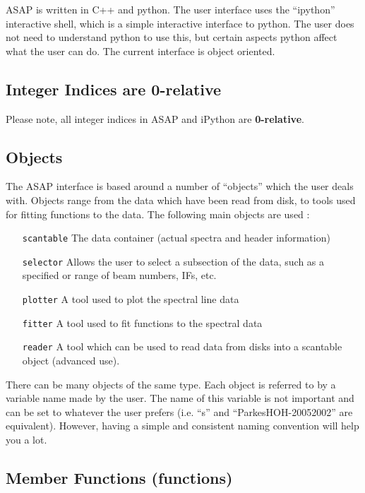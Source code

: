 \documentclass[11pt]{article}
\newcommand{\cmd}[1]{{\tt #1}}
\begin{document}
ASAP is written in C++ and python. The user interface
uses the ``ipython'' interactive shell, which is a simple interactive
interface to python. The user does not need to understand python to
use this, but certain aspects python affect what the user can do.  The
current interface is object oriented.

\subsection {Integer Indices are 0-relative}

Please note, all integer indices in ASAP and iPython are {\bf 0-relative}.

\subsection{Objects}
The ASAP interface is based around a number of ``objects'' which the
user deals with. Objects range from the data which have been read from
disk, to tools used for fitting functions to the data. The following
main objects are used :

\begin{itemize}
  \item[\cmd{scantable}] The data container (actual spectra and header
    information)
  \item[\cmd{selector}] Allows the user to select a subsection of the
    data, such as a specified or range of beam numbers, IFs, etc.
  \item[\cmd{plotter}] A tool used to plot the spectral line data
  \item[\cmd{fitter}] A tool used to fit functions to the spectral data
  \item[\cmd{reader}] A tool which can be used to read data from disks
    into a scantable object (advanced use).
\end{itemize}

There can be many objects of the same type. Each object is referred to
by a variable name made by the user. The name of this variable is not
important and can be set to whatever the user prefers (i.e. ``s'' and
``ParkesHOH-20052002'' are equivalent).  However, having a simple and
consistent naming convention will help you a lot.

\subsection{Member Functions (functions)}
\end{document}

